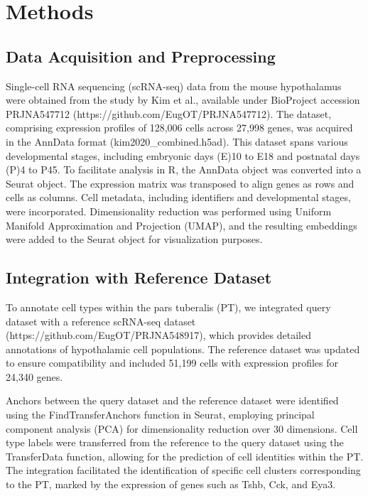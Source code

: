 \documentclass[
  number,
  preprint]{elsarticle}
\begin{document}
\section{Methods}\label{methods}

\subsection{Data Acquisition and
Preprocessing}\label{data-acquisition-and-preprocessing}

Single-cell RNA sequencing (scRNA-seq) data from the mouse hypothalamus
were obtained from the study by Kim et al.\citep{kim2020}, available
under BioProject accession PRJNA547712
(https://github.com/EugOT/PRJNA547712). The dataset, comprising
expression profiles of 128,006 cells across 27,998 genes, was acquired
in the AnnData format (kim2020\_combined.h5ad). This dataset spans
various developmental stages, including embryonic days (E)10 to E18 and
postnatal days (P)4 to P45. To facilitate analysis in R, the AnnData
object was converted into a Seurat
object\citep{haoDictionaryLearningIntegrative2023, stuartComprehensiveIntegrationSingleCell2019}.
The expression matrix was transposed to align genes as rows and cells as
columns. Cell metadata, including identifiers and developmental stages,
were incorporated. Dimensionality reduction was performed using Uniform
Manifold Approximation and Projection
(UMAP)\citep{mcinnes2018, kobakInitializationCriticalPreserving2021},
and the resulting embeddings were added to the Seurat object for
visualization purposes.

\subsection{Integration with Reference
Dataset}\label{integration-with-reference-dataset}

To annotate cell types within the pars tuberalis (PT), we integrated
query dataset\citep{kim2020} with a reference scRNA-seq dataset
(https://github.com/EugOT/PRJNA548917), which provides detailed
annotations of hypothalamic cell
populations\citep{romanovMolecularDesignHypothalamus2020}. The reference
dataset was updated to ensure compatibility and included 51,199 cells
with expression profiles for 24,340 genes.

Anchors between the query dataset\citep{kim2020} and the reference
dataset\citep{romanovMolecularDesignHypothalamus2020} were identified
using the FindTransferAnchors function in
Seurat\citep{haoDictionaryLearningIntegrative2023, stuartComprehensiveIntegrationSingleCell2019},
employing principal component analysis (PCA) for dimensionality
reduction over 30 dimensions. Cell type labels were transferred from the
reference to the query dataset using the TransferData function, allowing
for the prediction of cell identities within the
PT\citep{haoDictionaryLearningIntegrative2023}. The integration
facilitated the identification of specific cell clusters corresponding
to the PT, marked by the expression of genes such as Tshb, Cck, and
Eya3.
\end{document}
